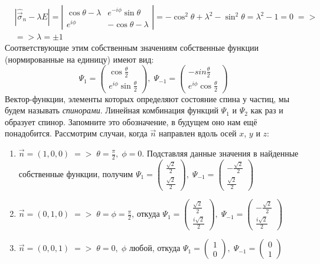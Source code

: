 \begin{align*}
    &|\hat{\Vec{\sigma}}_{n} - \lambda E| = \left|\begin{array}{cc}
        \cos\theta - \lambda & e^{-i\phi}\sin\theta \\
         e^{i\phi} & -\cos\theta - \lambda
    \end{array}
    \right| = -\cos^2\theta + \lambda^2 -\sin^2\theta = \lambda^2 - 1 = 0 \; => 
    \\ & => \lambda = \pm 1
\end{align*}
Соответствующие этим собственным значениям собственные функции (нормированные на единицу) имеют вид:
\[
\Psi_1 = \left(\begin{array}{c}
     \cos \frac{\theta}{2} \\
     e^{i\phi} \sin\frac{\theta}{2}
\end{array}
\right),\;
\Psi_{-1} = \left(\begin{array}{c}
    -sin\frac{\theta}{2} \\
    e^{i\phi}\cos\frac{\theta}{2}
\end{array}
\right)
\]
Вектор-функции, элементы которых определяют состояние спина у частиц, мы будем называть \textit{спинорами}. Линейная комбинация функций $\Psi_1$ и $\Psi_2$ как раз и образует спинор. Запомните это обозначение, в будущем оно нам ещё понадобится.
Рассмотрим случаи, когда $\Vec{n}$ направлен вдоль осей $x$, $y$ и $z$:
\begin{enumerate}
    \item $\Vec{n} = (1, 0, 0) \; => \; \theta = \frac{\pi}{2}, \; \phi = 0.$ Подставляя данные значения в найденные собственные функции, получим $\Psi_1 = \left(\begin{array}{c} \frac{\sqrt{2}}{2} \\ \frac{\sqrt{2}}{2} \end{array} \right),\;
    \Psi_{-1} = \left(\begin{array}{c} -\frac{\sqrt{2}}{2} \\ \frac{\sqrt{2}}{2}\end{array}\right)$
    \item $\Vec{n} = (0, 1, 0) \; => \; \theta = \phi = \frac{\pi}{2}$, откуда $\Psi_1 = \left(\begin{array}{c} \frac{\sqrt{2}}{2} \\ \frac{i\sqrt{2}}{2} \end{array}\right),\;
    \Psi_{-1} = \left(\begin{array}{c} -\frac{\sqrt{2}}{2} \\ \frac{i\sqrt{2}}{2} \end{array}\right)$
    \item $\Vec{n} = (0, 0, 1) \; => \; \theta = 0, \; \phi$ любой, откуда $\Psi_1 = \left(\begin{array}{c} 1 \\ 0 \end{array} \right),\;
    \Psi_{-1} = \left(\begin{array}{c} 0 \\ 1 \end{array}\right)$ 
\end{enumerate}
